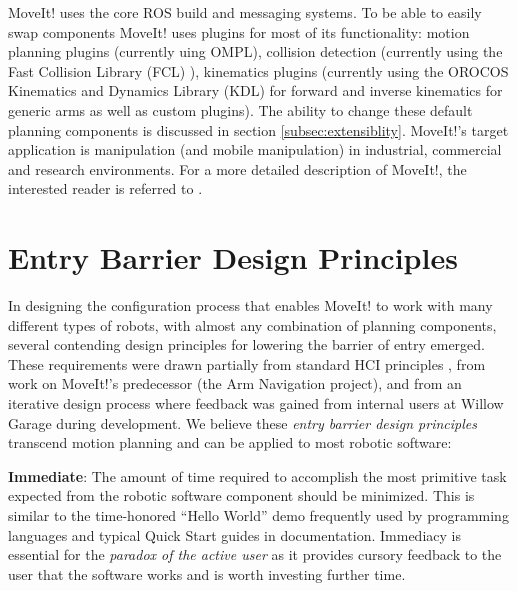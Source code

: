 \documentclass[10pt,journal,compsoc]{joser1}
\begin{document}
{MoveIt! uses the core ROS build and messaging systems. To be able to easily swap components MoveIt! uses plugins for most of its functionality: motion planning plugins (currently uing OMPL\cite{sucan2012the-open-motion-planning-library}), collision detection (currently using the Fast Collision Library (FCL) \cite{fcl}), kinematics plugins (currently using  the OROCOS Kinematics and Dynamics Library (KDL) \cite{kdl} for forward and inverse kinematics for generic arms as well as custom plugins). The ability to change these default planning components is discussed in section \ref{subsec:extensiblity}. MoveIt!'s target application is manipulation (and mobile manipulation) in industrial, commercial and research environments. For a more detailed description of MoveIt!, the interested reader is referred to \cite{moveit}.


\section{Entry Barrier Design Principles}
\label{sec::requirements}

In designing the configuration process that enables MoveIt! to work with many different types of robots, with almost any combination of planning components, several contending design principles for lowering the barrier of entry emerged. These requirements were drawn partially from standard HCI principles \cite{galitz2007essential}, from work on MoveIt!'s predecessor (the Arm Navigation project), and from an iterative design process where feedback was gained from internal users at Willow Garage during development. We believe these \textit{entry barrier design principles} transcend motion planning and can be applied to most robotic software:

{\bf Immediate}: The amount of time required to accomplish the most primitive task expected from the robotic software component should be minimized. This is similar to the time-honored ``Hello World'' demo frequently used by programming languages and typical Quick Start guides in documentation. Immediacy is essential for the \textit{paradox of the active user} as it provides cursory feedback to the user that the software works and is worth investing further time.

}
\end{document}
